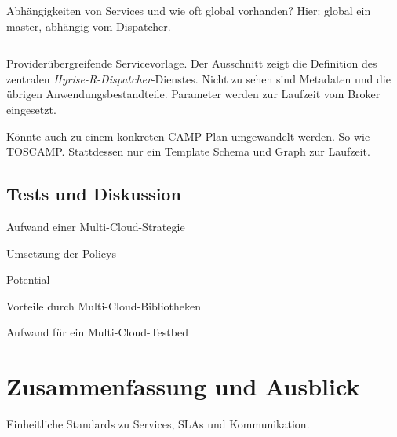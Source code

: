Abhängigkeiten von Services und wie oft global vorhanden? Hier: global ein master, abhängig vom Dispatcher.

\begin{listing}[ht]	
	\inputminted[firstline=15]{yaml}{./src/hyrise-r.sample.yaml}
	\caption{Providerübergreifende Servicevorlage. Der Ausschnitt zeigt die Definition des zentralen \emph{Hyrise-R-Dispatcher}-Dienstes. Nicht zu sehen sind Metadaten und die übrigen Anwendungsbestandteile. Parameter werden zur Laufzeit vom Broker eingesetzt.}
	\label{listing:hyrise-r}
\end{listing}

Könnte auch zu einem konkreten CAMP-Plan umgewandelt werden. So wie TOSCAMP. Stattdessen nur ein Template Schema und Graph zur Laufzeit.


\section{Tests und Diskussion}




Aufwand einer Multi-Cloud-Strategie

Umsetzung der Policys

Potential

Vorteile durch Multi-Cloud-Bibliotheken

Aufwand für ein Multi-Cloud-Testbed

\chapter{Zusammenfassung und Ausblick}

Einheitliche Standards zu Services, SLAs und Kommunikation.

